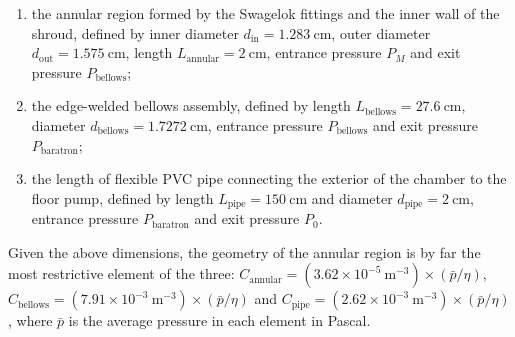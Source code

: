 \begin{enumerate}
	\item the annular region formed by the Swagelok fittings and the inner wall of the shroud, defined by inner diameter $d_{\textrm{in}} = 1.283 \ \textrm{cm}$, outer diameter $d_{\textrm{out}} = 1.575 \ \textrm{cm}$, length $L_{\textrm{annular}} = 2 \ \textrm{cm}$, entrance pressure $P_M$ and exit pressure $P_{\textrm{bellows}}$;
	\item the edge-welded bellows assembly, defined by length $L_{\textrm{bellows}} = 27.6 \ \textrm{cm}$, diameter $d_{\textrm{bellows}} = 1.7272 \ \textrm{cm}$, entrance pressure $P_{\textrm{bellows}}$ and exit pressure $P_{\textrm{baratron}}$;
	\item the length of flexible PVC pipe connecting the exterior of the chamber to the floor pump, defined by length $L_{\textrm{pipe}} = 150 \ \textrm{cm}$ and diameter $d_{\textrm{pipe}} = 2 \ \textrm{cm}$, entrance pressure $P_{\textrm{baratron}}$ and exit pressure $P_0$.
\end{enumerate}

Given the above dimensions, the geometry of the annular region is by far the most restrictive element of the three: $C_{\textrm{annular}} = (3.62 \times 10^{-5} \ \textrm{m}^{-3}) \times (\bar{p}/\eta)$, $C_{\textrm{bellows}} = (7.91 \times 10^{-3} \ \textrm{m}^{-3}) \times (\bar{p}/\eta)$ and $C_{\textrm{pipe}} = (2.62 \times 10^{-3} \ \textrm{m}^{-3}) \times (\bar{p}/\eta)$, where $\bar{p}$ is the average pressure in each element in Pascal. 




\noindent\makebox[\linewidth]{\rule{\paperwidth}{0.4pt}}

